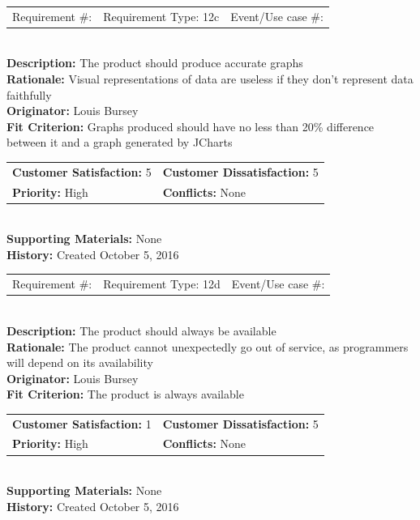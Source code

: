 \documentclass[12pt, titlepage]{article}
\begin{document}
%
%
\begin{reqbox}
\begin{tabular}{ccc}
Requirement \#: & Requirement Type: 12c & Event/Use case \#: \\
\end{tabular} \\
\textbf{Description:} The product should produce accurate graphs \\
\textbf{Rationale:} Visual representations of data are useless if they don't represent data faithfully \\
\textbf{Originator:} Louis Bursey\\
\textbf{Fit Criterion:}  Graphs produced should have no less than 20\% difference between it and a graph generated by JCharts  \\
\begin{tabular}{ll}
\textbf{Customer Satisfaction:} 5 & \textbf{Customer Dissatisfaction:} 5 \\
\textbf{Priority:} High & \textbf{Conflicts:} None\\
\end{tabular} \\
\textbf{Supporting Materials:} None \\
\textbf{History:} Created October 5, 2016
\end{reqbox}
%
%
\begin{reqbox}
\begin{tabular}{ccc}
Requirement \#: & Requirement Type: 12d & Event/Use case \#: \\
\end{tabular} \\
\textbf{Description:} The product should always be available \\
\textbf{Rationale:} The product cannot unexpectedly go out of service, as programmers will depend on its availability \\
\textbf{Originator:} Louis Bursey\\
\textbf{Fit Criterion:}  The product is always available  \\
\begin{tabular}{ll}
\textbf{Customer Satisfaction:} 1 & \textbf{Customer Dissatisfaction:} 5 \\
\textbf{Priority:} High & \textbf{Conflicts:} None\\
\end{tabular} \\
\textbf{Supporting Materials:} None \\
\textbf{History:} Created October 5, 2016
\end{reqbox}
\end{document}
